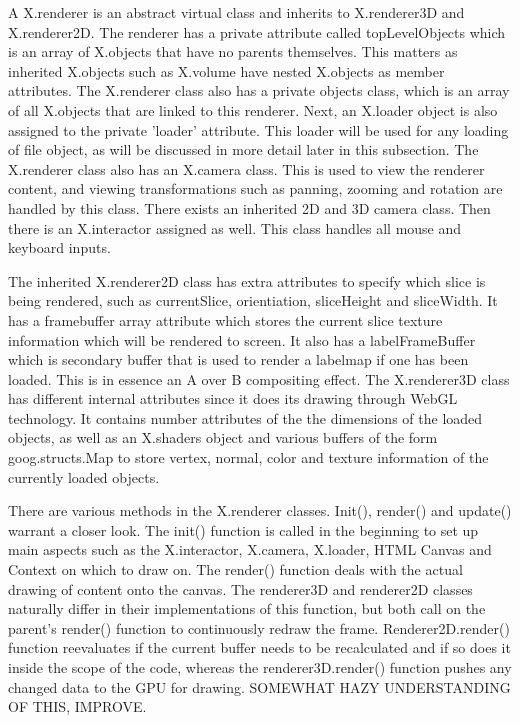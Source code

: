 \documentclass[a4paper,11pt,titlepage]{article}
\begin{document}
A X.renderer is an abstract virtual class and inherits to X.renderer3D and X.renderer2D.  The renderer has a private attribute called topLevelObjects which is an array of X.objects that have no parents themselves. This matters as inherited X.objects such as X.volume have nested X.objects as member attributes. The X.renderer class also has a private objects class, which is an array of all X.objects that are linked to this renderer. Next, an X.loader object is also assigned to the private 'loader' attribute. This loader will be used for any loading of file object, as will be discussed in more detail later in this subsection. The X.renderer class also has an X.camera class. This is used to view the renderer content, and viewing transformations such as panning, zooming and rotation are handled by this class. There exists an inherited 2D and 3D camera class. Then there is an X.interactor assigned as well. This class handles all mouse and keyboard inputs. 

The inherited X.renderer2D class has extra attributes to specify which slice is being rendered, such as currentSlice, orientiation, sliceHeight and sliceWidth. It has a framebuffer array attribute which stores the current slice texture information which will be rendered to screen. It also has a labelFrameBuffer which is secondary buffer that is used to render a labelmap if one has been loaded. This is in essence an A over B compositing effect. The X.renderer3D class has different internal attributes since it does its drawing through WebGL technology. It contains number attributes of the the dimensions of the loaded objects, as well as an X.shaders object and various buffers of the form goog.structs.Map to store vertex, normal, color and texture information of the currently loaded objects.

There are various methods in the X.renderer classes. Init(), render() and update() warrant a closer look. The init() function is called in the beginning to set up main aspects such as the X.interactor, X.camera, X.loader, HTML Canvas and Context on which to draw on. The render() function deals with the actual drawing of content onto the canvas. The renderer3D and renderer2D classes naturally differ in their implementations of this function, but both call on the parent's render() function to continuously redraw the frame. Renderer2D.render() function reevaluates if the current buffer needs to be recalculated and if so does it inside the scope of the code, whereas the renderer3D.render() function pushes any changed data to the GPU for drawing. SOMEWHAT HAZY UNDERSTANDING OF THIS, IMPROVE.
\end{document}
